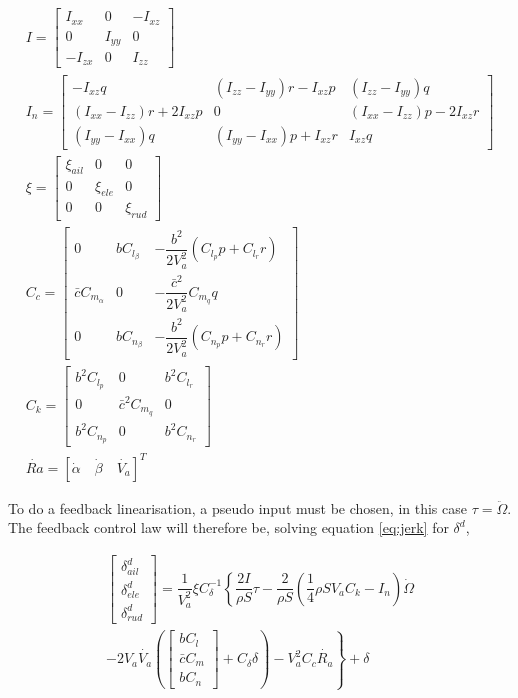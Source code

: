 \begin{gather*}
I=
\begin{bmatrix}
I_{xx} & 0 & -I_{xz}\\
0 & I_{yy} & 0\\
-I_{zx} & 0 & I_{zz}
\end{bmatrix}\\
I_n=
\left[\begin{smallmatrix}
-I_{xz}q & (I_{zz}-I_{yy})r-I_{xz}p & (I_{zz}-I_{yy})q\\
(I_{xx}-I_{zz})r+2I_{xz}p & 0 & (I_{xx}-I_{zz})p-2I_{xz}r\\
(I_{yy}-I_{xx})q & (I_{yy}-I_{xx})p+I_{xz}r & I_{xz}q
\end{smallmatrix}\right]\\
\xi=
\begin{bmatrix}
\xi_{ail} & 0 & 0\\
0 & \xi_{ele} & 0\\
0 & 0 & \xi_{rud}
\end{bmatrix}\\
C_c=
\begin{bmatrix}
0 & bC_{l_\beta} & -\dfrac{b^2}{2V_a^2}(C_{l_p}p+C_{l_r}r)\\
\bar{c}C_{m_\alpha} & 0 & -\dfrac{\bar{c}^2}{2V_a^2}C_{m_q}q\\
0 & bC_{n_\beta} & -\dfrac{b^2}{2V_a^2}(C_{n_p}p+C_{n_r}r)
\end{bmatrix}\\
C_k=
\begin{bmatrix}
b^2C_{l_p} & 0 & b^2C_{l_r}\\
0 & \bar{c}^2C_{m_q} & 0\\
b^2C_{n_p} & 0 & b^2C_{n_r}
\end{bmatrix}\\
\dot{Ra} =  [\dot{\alpha} \quad \dot{\beta} \quad \dot{V_a}]^T
\end{gather*}

To do a feedback linearisation, a pseudo input must be chosen, in this case $\tau = \ddot{\Omega}$. The feedback control law will therefore be, solving equation \ref{eq:jerk} for $\delta^d$,

\begin{equation}
\begin{split}
\begin{bmatrix}
\delta^d_{ail}\\
\delta^d_{ele}\\
\delta^d_{rud}
\end{bmatrix}
=\dfrac{1}{V_a^2}\xi C_\delta^{-1}\left\lbrace\dfrac{2I}{\rho S}\tau - \dfrac{2}{\rho S}(\dfrac{1}{4}\rho S V_aC_k - I_n)\dot{\Omega}\right.\\
\left. -2V_a\dot{V_a} \left(
\begin{bmatrix}
bC_l\\
\bar{c}C_m\\
bC_n
\end{bmatrix}
+ C_\delta \delta\right)-V_a^2C_c\dot{R_a} \right\rbrace+ \delta
\label{eq:control_law}
\end{split}
\end{equation}


